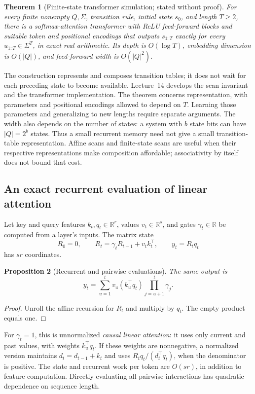 \documentclass[11pt,twoside]{article}
\newcommand{\R}{\mathbb R}
\newtheorem{theorem}{Theorem}[section]
\newtheorem{proposition}[theorem]{Proposition}
\theoremstyle{definition}
\theoremstyle{remark}
\begin{document}
\begin{theorem}[Finite-state transformer simulation; stated without proof]
\label{thm:finite-state-scan}
For every finite nonempty \(Q,\Sigma\), transition rule, initial state \(s_0\), and
length \(T\geq2\), there is a softmax-attention transformer with ReLU
feed-forward blocks and suitable token and positional encodings that
outputs \(s_{1:T}\) exactly for every \(u_{1:T}\in\Sigma^T\), in exact real arithmetic.
Its depth is \(O(\log T)\), embedding dimension is \(O(|Q|)\), and
feed-forward width is \(O(|Q|^2)\).
\end{theorem}

The construction represents and composes transition tables; it does not
wait for each preceding state to become available. Lecture~14 develops
the scan invariant and the transformer implementation.
The theorem concerns representation, with parameters and positional
encodings allowed to depend on \(T\). Learning those parameters and
generalizing to new lengths require separate arguments.
The width also depends on the number of states: a system with \(b\) state
bits can have \(|Q|=2^b\) states. Thus a small recurrent memory need not
give a small transition-table representation. Affine scans and finite-state
scans are useful when their respective representations make composition
affordable; associativity by itself does not bound that cost.

\subsection{An exact recurrent evaluation of linear attention}
\label{sec:attention-state}

Let key and query features \(k_t,q_t\in\R^r\), values \(v_t\in\R^s\),
and gates \(\gamma_t\in\R\) be computed from a layer's inputs.
The matrix state
\begin{equation}
 R_0=0,\qquad R_t=\gamma_tR_{t-1}+v_tk_t^\top,\qquad
 y_t=R_tq_t
 \label{eq:attention-recurrence}
\end{equation}
has \(sr\) coordinates.
\begin{proposition}[Recurrent and pairwise evaluations]
\label{prop:attention-recurrence}
The same output is
\[
 y_t=\sum_{u=1}^t v_u(k_u^\top q_t)
              \prod_{j=u+1}^t\gamma_j.
\]
\end{proposition}
\begin{proof}
Unroll the affine recursion for \(R_t\) and multiply by \(q_t\).
The empty product equals one.
\end{proof}
For \(\gamma_t=1\), this is unnormalized \emph{causal linear attention}:
it uses only current and past values, with weights \(k_u^\top q_t\).
If these weights are nonnegative, a normalized version maintains
\(d_t=d_{t-1}+k_t\) and uses \(R_tq_t/(d_t^\top q_t)\), when the
denominator is positive. The state and recurrent work per token are
\(O(sr)\), in addition to feature computation. Directly evaluating
all pairwise interactions has quadratic dependence on sequence length.
\end{document}
